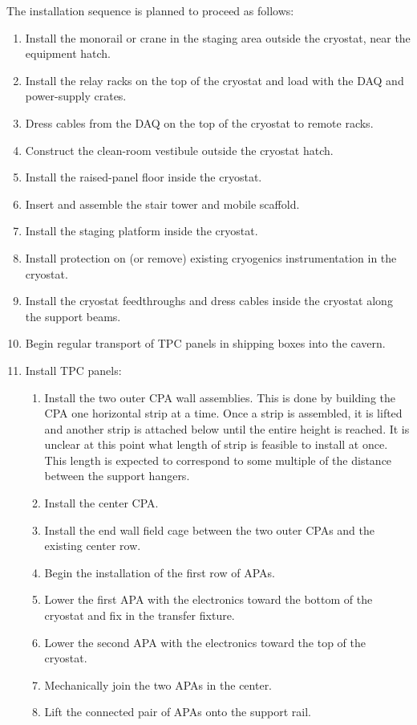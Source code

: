 The installation sequence is planned to proceed as follows: 
\begin{enumerate}
\item Install the monorail or crane in the staging area outside the cryostat, near the equipment hatch. 
\item Install the relay racks on the top of the cryostat and load with the DAQ and power-supply crates. 
\item Dress cables from the DAQ on the top of the cryostat to remote racks. 
\item Construct the clean-room vestibule outside the cryostat hatch. 
\item Install the raised-panel floor inside the cryostat. 
\item Insert and assemble the stair tower and mobile scaffold. 
\item Install the staging platform inside the cryostat.
\item Install protection on (or remove) existing cryogenics instrumentation in the cryostat. 
\item Install the cryostat feedthroughs and dress cables inside the cryostat along the support beams. 
\item Begin regular transport of TPC panels in shipping boxes into the cavern. 
\item Install TPC panels: 
\begin{enumerate}
\item Install the two outer CPA wall assemblies.  This is done by building the CPA one horizontal strip at a time.  Once a strip is assembled, it is lifted and another strip is attached below until the entire height is reached.  It is unclear at this point what length of strip is feasible to install at once.  This length is expected to correspond to some multiple of the distance between the support hangers.  
\item Install the center CPA.
\item Install the end wall field cage between the two outer CPAs and the existing center row. 
\item Begin the installation of the first row of APAs.
\item Lower the first APA with the electronics toward the bottom of the cryostat and fix in the transfer fixture.
\item Lower the second APA with the electronics toward the top of the cryostat.
\item Mechanically join the two APAs in the center.  
\item Lift the connected pair of APAs onto the support rail.

\end{enumerate}
\end{enumerate}
